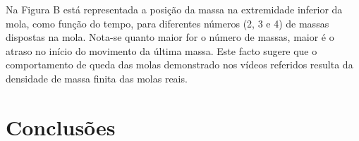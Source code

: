 \documentclass{article}
\begin{document}
Na Figura B está representada a posição da massa na extremidade inferior da
mola, como função do tempo, para diferentes números (2, 3 e 4) de massas
dispostas na mola. Nota-se quanto maior for o número de massas, maior é o
atraso no início do movimento da última massa. Este facto sugere que o
comportamento de queda das molas demonstrado nos vídeos referidos resulta da
densidade de massa finita das molas reais.

\section*{Conclusões}

\begin{figure}[b]
  \caption{\label{fig:a}}
\end{figure}
\begin{thebibliography}{99}
   { }
\end{thebibliography}
\end{document}
